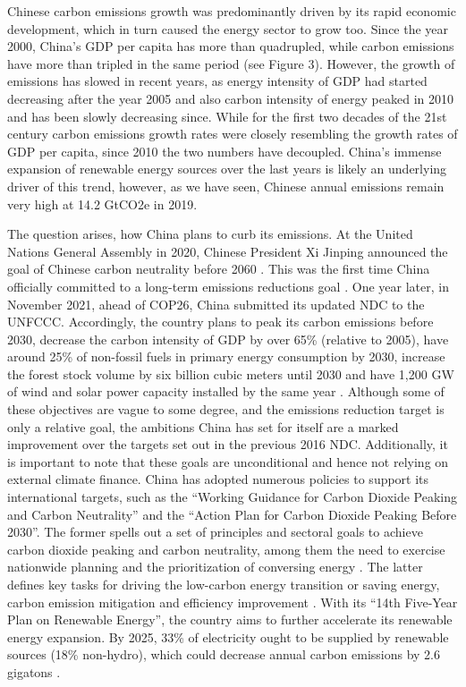 \documentclass[
  12pt,
]{article}
\numberwithin{equation}{section}
\numberwithin{table}{section}
\numberwithin{figure}{section}
\begin{document}
Chinese carbon emissions growth was predominantly driven by its rapid
economic development, which in turn caused the energy sector to grow
too. Since the year 2000, China's GDP per capita has more than
quadrupled, while carbon emissions have more than tripled in the same
period (see Figure 3). However, the growth of emissions has slowed in
recent years, as energy intensity of GDP had started decreasing after
the year 2005 and also carbon intensity of energy peaked in 2010 and has
been slowly decreasing since. While for the first two decades of the
21st century carbon emissions growth rates were closely resembling the
growth rates of GDP per capita, since 2010 the two numbers have
decoupled. China's immense expansion of renewable energy sources over
the last years is likely an underlying driver of this trend, however, as
we have seen, Chinese annual emissions remain very high at 14.2 GtCO2e
in 2019.

The question arises, how China plans to curb its emissions. At the
United Nations General Assembly in 2020, Chinese President Xi Jinping
announced the goal of Chinese carbon neutrality before 2060
\citep{Jinping2020}. This was the first time China officially committed
to a long-term emissions reductions goal \citep{CAT2022}. One year
later, in November 2021, ahead of COP26, China submitted its updated NDC
to the UNFCCC. Accordingly, the country plans to peak its carbon
emissions before 2030, decrease the carbon intensity of GDP by over 65\%
(relative to 2005), have around 25\% of non-fossil fuels in primary
energy consumption by 2030, increase the forest stock volume by six
billion cubic meters until 2030 and have 1,200 GW of wind and solar
power capacity installed by the same year \citep{China2021}. Although
some of these objectives are vague to some degree, and the emissions
reduction target is only a relative goal, the ambitions China has set
for itself are a marked improvement over the targets set out in the
previous 2016 NDC. Additionally, it is important to note that these
goals are unconditional and hence not relying on external climate
finance. China has adopted numerous policies to support its
international targets, such as the ``Working Guidance for Carbon Dioxide
Peaking and Carbon Neutrality'' and the ``Action Plan for Carbon Dioxide
Peaking Before 2030''. The former spells out a set of principles and
sectoral goals to achieve carbon dioxide peaking and carbon neutrality,
among them the need to exercise nationwide planning and the
prioritization of conversing energy \citep{DRCEP2021a}. The latter
defines key tasks for driving the low-carbon energy transition or saving
energy, carbon emission mitigation and efficiency improvement
\citep{DRCEP2021b}. With its ``14th Five-Year Plan on Renewable
Energy'', the country aims to further accelerate its renewable energy
expansion. By 2025, 33\% of electricity ought to be supplied by
renewable sources (18\% non-hydro), which could decrease annual carbon
emissions by 2.6 gigatons \citep{Zhou2022}.
\end{document}
